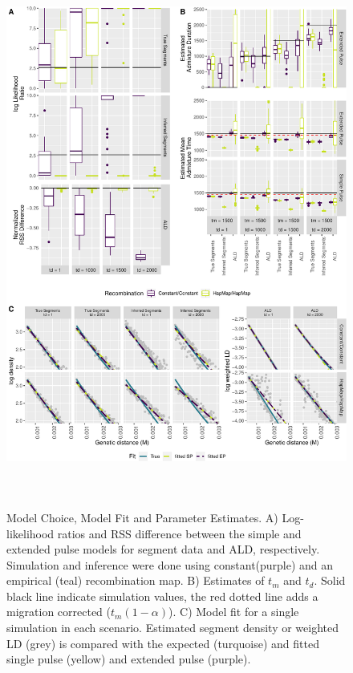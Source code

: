 \documentclass[11pt]{article}
\begin{document}
\begin{figure}
\centering
\includegraphics[width=16cm,height=18cm,keepaspectratio]{Fig_3_MBE-21-0164_R1_Peter_Iasi.pdf}
\caption{\label{fig:figResult2} Model Choice, Model Fit and Parameter Estimates. A) Log-likelihood ratios and RSS difference between the simple and extended pulse models for segment data and ALD, respectively. Simulation and inference were done using constant(purple) and an empirical (teal) recombination map. B) Estimates of $t_m$ and $t_d$. Solid black line indicate simulation values, the red dotted line adds a migration corrected ($t_m(1-\alpha)$). C) Model fit for a single simulation in each scenario. Estimated segment density or weighted LD (grey) is compared with the expected (turquoise) and fitted single pulse (yellow) and extended pulse (purple). }
\end{figure}
\end{document}
